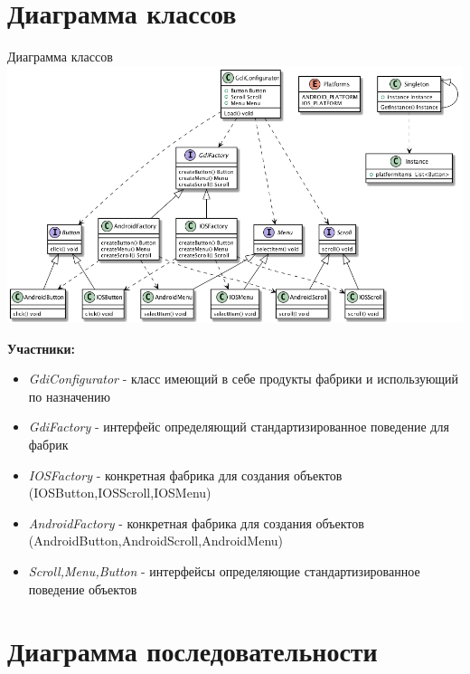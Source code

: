 \documentclass[PI,LAB]{HSEUniversity}
\begin{document}
\section{Диаграмма классов}
\begin{FIGURE}[h]{Диаграмма классов \label{fig:example-figure}}
	\includegraphics[width=\textwidth]{out/diagrams/factory-go/factory-go}
\end{FIGURE}

\textbf{Участники:}
\begin{itemize}
	\item \emph{GdiConfigurator} - класс имеющий в себе продукты фабрики и использующий по назначению
	\item \emph{GdiFactory} - интерфейс определяющий стандартизированное поведение для фабрик
	\item \emph{IOSFactory} - конкретная фабрика для создания объектов  (IOSButton,IOSScroll,IOSMenu)
	\item \emph{AndroidFactory} - конкретная фабрика для создания объектов  (AndroidButton,AndroidScroll,AndroidMenu) 
	\item \emph{Scroll,Menu,Button} - интерфейсы определяющие стандартизированное  поведение объектов 
\end{itemize}


\section{Диаграмма последовательности }
\end{document}
